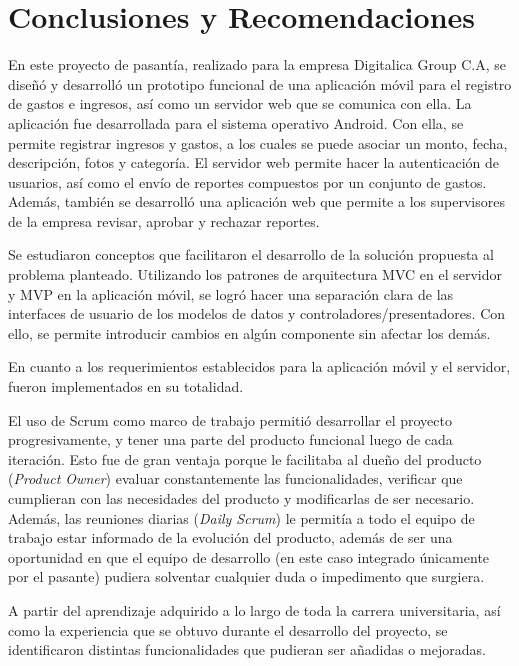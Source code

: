 \chapter{Conclusiones y Recomendaciones} \label{chap:conclusiones}

En este proyecto de pasantía, realizado para la empresa Digitalica Group C.A, se diseñó y desarrolló un prototipo funcional de una aplicación móvil para el registro de gastos e ingresos, así como un servidor web que se comunica con ella.  La aplicación fue desarrollada para el sistema operativo Android. Con ella, se permite registrar ingresos y gastos, a los cuales se puede asociar un monto, fecha, descripción, fotos y categoría. El servidor web permite hacer la autenticación de usuarios, así como el envío de reportes compuestos por un conjunto de gastos. Además, también se desarrolló una aplicación web que permite a los supervisores de la empresa revisar, aprobar y rechazar reportes.

Se estudiaron conceptos que facilitaron el desarrollo de la solución propuesta al problema planteado. Utilizando los patrones de arquitectura MVC en el servidor y MVP en la aplicación móvil, se logró hacer una separación clara de las interfaces de usuario de los modelos de datos y controladores/presentadores. Con ello, se permite introducir cambios en algún componente sin afectar los demás.

En cuanto a los requerimientos establecidos para la aplicación móvil y el servidor, fueron implementados en su totalidad.

El uso de Scrum como marco de trabajo permitió desarrollar el proyecto progresivamente, y tener una parte del producto funcional luego de cada iteración. Esto fue de gran ventaja porque le facilitaba al dueño del producto (\textit{Product Owner}) evaluar constantemente las funcionalidades, verificar que cumplieran con las necesidades del producto y modificarlas de ser necesario. Además, las reuniones diarias (\textit{Daily Scrum}) le permitía a todo el equipo de trabajo estar informado de la evolución del producto, además de ser una oportunidad en que el equipo de desarrollo (en este caso integrado únicamente por el pasante) pudiera solventar cualquier duda o impedimento que surgiera.

A partir del aprendizaje adquirido a lo largo de toda la carrera universitaria, así como la experiencia que se obtuvo durante el desarrollo del proyecto, se identificaron distintas funcionalidades que pudieran ser añadidas o mejoradas.

